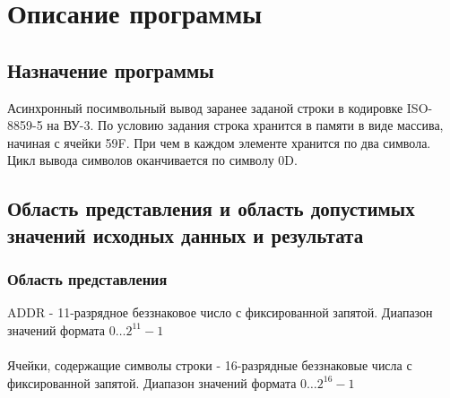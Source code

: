 
\newpage

\section{Описание программы}
\subsection{Назначение программы}
Асинхронный посимвольный вывод заранее заданой строки в кодировке ISO-8859-5 на ВУ-3. По условию задания строка хранится в памяти в виде массива, начиная с ячейки 59F. При чем в каждом элементе хранится по два символа. Цикл вывода символов оканчивается по символу 0D.

\subsection{Область представления и область допустимых значений исходных данных и результата}
\subsubsection{Область представления}
 ADDR - 11-разрядное беззнаковое число с фиксированной запятой. Диапазон значений формата $ 0\ldots2^{11}-1 $\\
\\
Ячейки, содержащие символы строки - 16-разрядные беззнаковые числа с фиксированной запятой. Диапазон значений формата $ 0\ldots2^{16}-1 $\\

